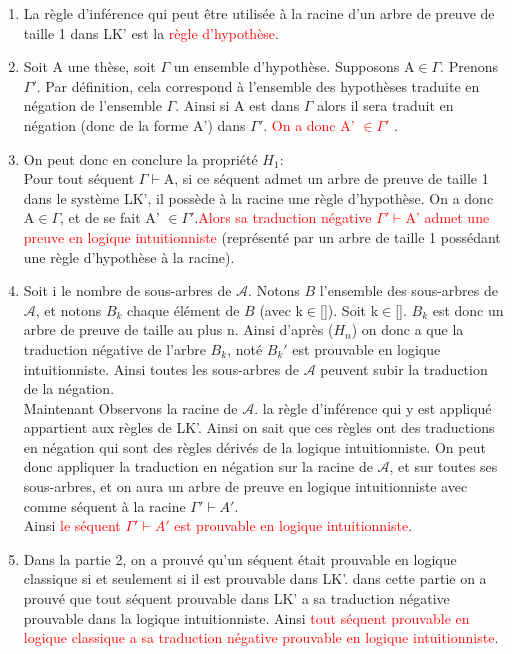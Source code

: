 \documentclass[12pt,a4paper]{article}
\newcommand{\result}[1]{\textcolor{red}{#1}}
\newcommand{\db}[1]{$#1\!#1$} %
\newcommand{\g}{\Gamma}
\renewcommand{\t}{\vdash}
\newcounter{qst}
\newenvironment{question}{\noindent{\large \textbf{Exercice \theqst :\\ }}}{\addtocounter{qst}{1}}
\begin{document}
\begin{question}
\begin{enumerate}
\item La règle d'inférence qui peut être utilisée à la racine d'un arbre de preuve de taille 1 dans LK' est la \result{règle d'hypothèse}.
\item Soit A une thèse, soit $\g$ un ensemble d'hypothèse. Supposons A$\in\g$.
Prenons $\g'$. Par définition, cela correspond à l'ensemble des hypothèses traduite en négation de l'ensemble $\g$. Ainsi si A est dans $\g$ alors il sera traduit en négation (donc de la forme A') dans $\g'$. \result{On a donc A' $ \in\g'$} .
\item On peut donc en conclure la propriété $H_1$:\\
Pour tout séquent $\g\t$A, si ce séquent admet un arbre de preuve de taille 1 dans le système LK', il possède à la racine une règle d'hypothèse. On a donc A$\in\g$, et de se fait A' $ \in\g'$.\result{Alors sa traduction négative $\g'\t$A' admet une preuve en logique intuitionniste} (représenté par un arbre de taille 1 possédant une règle d'hypothèse à la racine).
\item Soit i le nombre de sous-arbres de $\mathcal{A}$. Notons $B$ l'ensemble des sous-arbres de $\mathcal{A}$, et notons $B_k$ chaque élément de $B$ (avec k$\in \db{[}0;i\db{]} $). Soit k$\in \db{[}0;i\db{]} $. $B_k$ est donc un arbre de preuve de taille au plus n. Ainsi d'après ($H_n$) on donc a que la traduction négative de l'arbre $B_k$, noté $B_k'$ est prouvable en logique intuitionniste. Ainsi toutes les sous-arbres de $\mathcal{A}$ peuvent subir la traduction de la négation.\\
Maintenant Observons la racine de $\mathcal{A}$. la règle d'inférence qui y est appliqué appartient aux règles de LK'. Ainsi on sait que ces règles ont des traductions en négation qui sont des règles dérivés de la logique intuitionniste. On peut donc appliquer la traduction en négation sur la racine de $\mathcal{A}$, et sur toutes ses sous-arbres, et on aura un arbre de preuve en logique intuitionniste avec comme séquent à la racine $\g'\t A'$.\\
 Ainsi \result{le séquent $\g'\t A'$ est prouvable en logique intuitionniste}.
\item Dans la partie 2, on a prouvé qu'un séquent était prouvable en logique classique si et seulement si il est prouvable dans LK'. dans cette partie on a prouvé que tout séquent prouvable dans LK' a sa traduction négative prouvable dans la logique intuitionniste. Ainsi \result{tout séquent prouvable en logique classique a sa traduction négative prouvable en logique intuitionniste}.
\end{enumerate}
\end{question}
\end{document}
